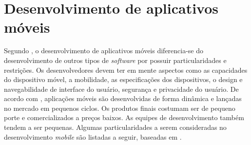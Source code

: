 \chapter{Desenvolvimento de aplicativos móveis} \label{cap:referencialteorico} 

Segundo , o desenvolvimento de aplicativos móveis diferencia-se do desenvolvimento de outros tipos de \textit{software} por possuir particularidades e restrições. Os desenvolvedores devem ter em mente aspectos como as capacidades do dispositivo móvel, a mobilidade, as especificações dos dispositivos, o design e navegabilidade de interface do usuário, segurança e privacidade do usuário.
 De acordo com , aplicações móveis  são desenvolvidas de forma dinâmica e lançadas no mercado em pequenos ciclos. Os produtos finais costumam ser de pequeno porte e comercializados a preços baixos. As equipes de desenvolvimento também tendem a ser pequenas.
Algumas particularidades a serem consideradas no desenvolvimento \textit{mobile} são listadas a seguir, baseadas em .

